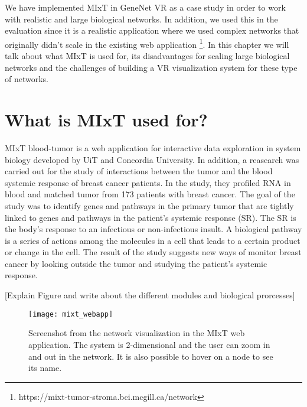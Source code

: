 
We have implemented MIxT in GeneNet VR as a case study in order to work with realistic and large biological networks. In addition, we used this in the evaluation since it is a realistic application where we used complex networks that originally didn't scale in the existing web application \footnote{https://mixt-tumor-stroma.bci.mcgill.ca/network}.
In this chapter we will talk about what MIxT is used for, its disadvantages for scaling large biological networks and the challenges of building a VR visualization system for these type of networks.

\section{What is MIxT used for?}
MIxT blood-tumor is a web application for interactive data exploration in system biology developed by UiT and Concordia University\cite{fjukstad_dumeaux_olsen_lund_hallett_bongo_2017}. In addition, a reasearch was carried out for the study of interactions between the tumor and the blood systemic response of breast cancer patients\cite{dumeaux_fjukstad_interactions_tumor_blood}. In the study, they profiled RNA in blood and matched tumor from 173 patients with breast cancer. The goal of the study was to identify genes and pathways in the primary tumor that are tightly linked to genes and pathways in the patient's systemic response (SR). The SR is the body's response to an infectious or non-infectious insult. A biological pathway is a series of actions among the molecules in a cell that leads to a certain product or change in the cell. The result of the study suggests new ways of monitor breast cancer by looking outside the tumor and studying the patient's systemic response.

[Explain Figure and write about the different modules and biological prorcesses]

\begin{figure}[h!]
    \setlength{\tempheight}{15ex}
    \centering
    \texttt{[image: mixt\_webapp]}
    \caption{Screenshot from the network visualization in the MIxT web application. The system is 2-dimensional and the user can zoom in and out in the network. It is also possible to hover on a node to see its name.}
    \label{fig:mixt_webapp}
\end{figure}

